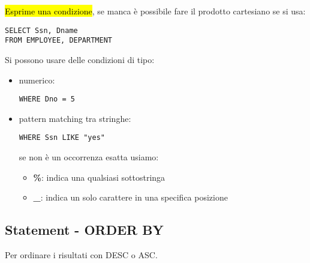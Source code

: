 \hl{Esprime una condizione}, se manca è possibile fare il prodotto cartesiano se si usa:

\begin{lstlisting}
SELECT Ssn, Dname
FROM EMPLOYEE, DEPARTMENT
\end{lstlisting}

Si possono usare delle condizioni di tipo:

\begin{itemize}
	\item numerico:

\begin{lstlisting}
WHERE Dno = 5
\end{lstlisting}

	\item pattern matching tra stringhe:

\begin{lstlisting}
WHERE Ssn LIKE "yes"
\end{lstlisting}
	
		se non è un occorrenza esatta usiamo:

			\begin{itemize}
				\item \textbf{\%}: indica una qualsiasi sottostringa
				\item \textbf{\_}: indica un solo carattere in una specifica posizione
			\end{itemize}

\end{itemize}


\subsection{Statement - ORDER BY}

Per ordinare i risultati con DESC o ASC.

